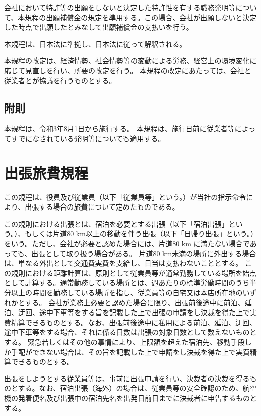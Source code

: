 \documentclass[10pt,a4paper,uplatex]{jsarticle}
\begin{document}
会社において特許等の出願をしないと決定した特許性を有する職務発明等について、本規程の出願補償金の規定を準用する。この場合、会社が出願しないと決定した時点で出願したとみなして出願補償金の支払いを行う。

本規程は、日本法に準拠し、日本法に従って解釈される。

本規程の改定は、経済情勢、社会情勢等の変動による労務、経営上の環境変化に応じて見直しを行い、所要の改定を行う。
\term 本規程の改定にあたっては、会社と従業者とが協議を行うものとする。

\subsection*{附則}
本規程は、令和3年8月1日から施行する。
本規程は、施行日前に従業者等によってすでになされている発明等についても適用する。

\clearpage
\section{出張旅費規程}

この規程は、役員及び従業員（以下「従業員等」という。）が当社の指示命令により、出張する場合の旅費について定めたものである。

この規則における出張とは、宿泊を必要とする出張（以下「宿泊出張」という。）、もしくは片道80 km以上の移動を伴う出張（以下「日帰り出張」という。）をいう。ただし、会社が必要と認めた場合には、片道80 km に満たない場合であっても、出張として取り扱う場合がある。
\term 片道80 km未満の場所に外出する場合は、単なる外出として交通費実費を支給し、日当は支払わないこととする。
\term この規則における距離計算は、原則として従業員等が通常勤務している場所を始点として計算する。通常勤務している場所とは、週あたりの標準労働時間のうち半分以上の時間を勤務している場所を指し、従業員等の自宅又は本店所在地のいずれかとする。
\term 会社が業務上必要と認めた場合に限り、出張前後途中に前泊、延泊、迂回、途中下車等をする旨を記載した上で出張の申請をし決裁を得た上で実費精算できるものとする。なお、出張前後途中に私用による前泊、延泊、迂回、途中下車等をする場合、それに係る日数は出張の対象日数として数えないものとする。
\term 緊急若しくはその他の事情により、上限額を超えた宿泊先、移動手段しか手配ができない場合は、その旨を記載した上で申請をし決裁を得た上で実費精算できるものとする。

出張をしようとする従業員等は、事前に出張申請を行い、決裁者の決裁を得るものとする。なお、宿泊出張（海外）の場合は、従業員等の安全確認のため、航空機の発着便名及び出張中の宿泊先名を出発日前日までに決裁者に申告するものとする。
\end{document}
